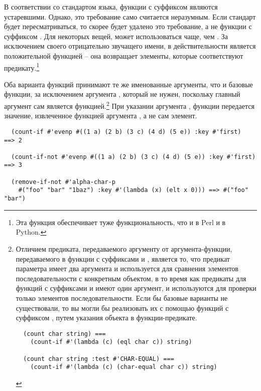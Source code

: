 В соответствии со стандартом языка, функции с суффиксом  являются
устаревшими.  Однако, это требование само считается неразумным.  Если стандарт будет
пересматриваться, то скорее будет удалено это требование, а не функции с суффиксом
.  Для некоторых вещей,  может использоваться чаще, чем
.  За исключением своего отрицательно звучащего имени, в действительности
 является положительной функцией -- она возвращает элементы, которые
соответствуют предикату.\footnote{Эта функция обеспечивает туже функциональность, что и
   в Perl и  в Python.}

Оба варианта функций принимают те же именованные аргументы, что и базовые функции, за
исключением аргумента , который не нужен, поскольку главный аргумент сам
является функцией.\footnote{Отличием предиката, передаваемого аргументу  от
  аргумента-функции, передаваемого в функции с суффиксами  и ,
  является то, что предикат параметра  имеет два аргумента и используется для
  сравнения элементов последовательности с конкретным объектом, в то время как предикаты
  для функций с суффиксами  и  имеют один аргумент, и используются
  для проверки только элементов последовательности.  Если бы базовые варианты не
  существовали, то вы могли бы реализовать их с помощью функций с суффиксом ,
  путем указания объекта в функции-предикате.

\begin{verbatim}
  (count char string) ===
    (count-if #'(lambda (c) (eql char c)) string)
  
  (count char string :test #'CHAR-EQUAL) ===
    (count-if #'(lambda (c) (char-equal char c)) string)
\end{verbatim}

}  При указании аргумента , функции передается значение, извлеченное функцией
аргумента , а не сам элемент.

\begin{verbatim}
  (count-if #'evenp #((1 a) (2 b) (3 c) (4 d) (5 e)) :key #'first)     ==> 2

  (count-if-not #'evenp #((1 a) (2 b) (3 c) (4 d) (5 e)) :key #'first) ==> 3

  (remove-if-not #'alpha-char-p
    #("foo" "bar" "1baz") :key #'(lambda (x) (elt x 0))) ==> #("foo" "bar")
\end{verbatim}

